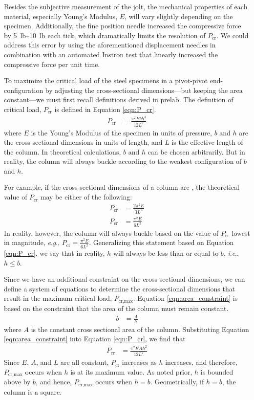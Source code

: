\documentclass[12 pt]{article}
\newcommand{\ie}{\textit{i}.\textit{e}., }
\newcommand{\eg}{\textit{e}.\textit{g}., }
\begin{document}
Besides the subjective measurement of the jolt, the mechanical properties of each material, especially Young's Modulus, $E$, will vary slightly depending on the specimen. Additionally, the fine position needle increased the compressive force by \qtyrange{5}{10}{lb} each tick, which dramatically limits the resolution of $P_\text{cr}$. We could address this error by using the aforementioned displacement needles in combination with an automated Instron test that linearly increased the compressive force per unit time.

To maximize the critical load of the steel specimens in a pivot-pivot end-configuration by adjusting the cross-sectional dimensions---but keeping the area constant---we must first recall definitions derived in prelab. The definition of critical load, $P_\text{cr}$ is defined in Equation \ref{eqn:P_cr}.
\begin{align}
	P_\text{cr}&=\frac{\pi^2Ebh^3}{12L^2}\label{eqn:P_cr}
\end{align}
where $E$ is the Young's Modulus of the specimen in units of pressure, $b$ and $h$ are the cross-sectional dimensions in units of length, and $L$ is the effective length of the column. In theoretical calculations, $b$ and $h$ can be chosen arbitrarily. But in reality, the column will always buckle according to the weakest configuration of $b$ and $h$.

For example, if the cross-sectional dimensions of a column are , the theoretical value of $P_\text{cr}$ may be either of the following:
\begin{align*}
	P_\text{cr}&=\frac{2\pi^2E}{3L^2}\\
	P_\text{cr}&=\frac{\pi^2E}{6L^2}
\end{align*}
In reality, however, the column will always buckle based on the value of $P_\text{cr}$ lowest in magnitude, \eg $P_\text{cr}=\frac{\pi^2E}{6L^2}$. Generalizing this statement based on Equation \ref{eqn:P_cr}, we say that in reality, $h$ will always be less than or equal to $b$, \ie $h\le{}b$.

Since we have an additional constraint on the cross-sectional dimensions, we can define a system of equations to determine the cross-sectional dimensions that result in the maximum critical load, $P_\text{cr,max}$. Equation \ref{eqn:area_constraint} is based on the constraint that the area of the column must remain constant.
\begin{align}
	b&=\frac{A}{h}\label{eqn:area_constraint}
\end{align}
where $A$ is the constant cross sectional area of the column. Substituting Equation \ref{eqn:area_constraint} into Equation \ref{eqn:P_cr}, we find that
\begin{align}
	P_\text{cr}&=\frac{\pi^2EAh^2}{12L^2}\label{eqn:subsituted_P_cr}
\end{align}
Since $E$, $A$, and $L$ are all constant, $P_\text{cr}$ increases as $h$ increases, and therefore, $P_\text{cr,max}$ occurs when $h$ is at its maximum value. As noted prior, $h$ is bounded above by $b$, and hence, $P_\text{cr,max}$ occurs when $h=b$. Geometrically, if $h=b$, the column is a square.
\end{document}
